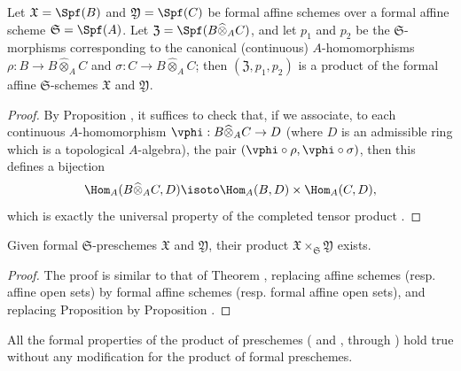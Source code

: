 \begin{proposition}[10.7.2]
\label{I.10.7.2}
Let $\mathfrak{X}=\Spf(B)$ and $\mathfrak{Y}=\Spf(C)$ be formal affine schemes over a formal affine scheme $\mathfrak{S}=\Spf(A)$.
Let $\mathfrak{Z}=\Spf(B\widehat{\otimes}_A C)$, and let $p_1$ and $p_2$ be the $\mathfrak{S}$-morphisms corresponding  to the canonical (continuous) $A$-homomorphisms $\rho: B\to B\widehat{\otimes}_A C$ and $\sigma:C\to B\widehat{\otimes}_A C$; then $(\mathfrak{Z},p_1,p_2)$ is a product of the formal affine $\mathfrak{S}$-schemes $\mathfrak{X}$ and $\mathfrak{Y}$.
\end{proposition}

\begin{proof}
By Proposition , it suffices to check that, if we associate, to each continuous $A$-homomorphism $\vphi:B\widehat{\otimes}_A C\to D$ (where $D$ is an admissible ring which is a topological $A$-algebra), the pair $(\vphi\circ\rho,\vphi\circ\sigma)$, then this defines a bijection
\[
  \Hom_A(B\widehat{\otimes}_A C,D)\isoto\Hom_A(B,D)\times\Hom_A(C,D),
\]
which is exactly the universal property of the completed tensor product .
\end{proof}

\begin{proposition}[10.7.3]
\label{I.10.7.3}
Given formal $\mathfrak{S}$-preschemes $\mathfrak{X}$ and $\mathfrak{Y}$, their product $\mathfrak{X}\times_\mathfrak{S}\mathfrak{Y}$ exists.
\end{proposition}

\begin{proof}
The proof is similar to that of Theorem , replacing affine schemes (resp. affine open sets) by formal affine schemes (resp. formal affine open sets), and replacing Proposition  by Proposition .
\end{proof}

All the formal properties of the product of preschemes ( and ,  through ) hold true without any modification for the product of formal preschemes.

